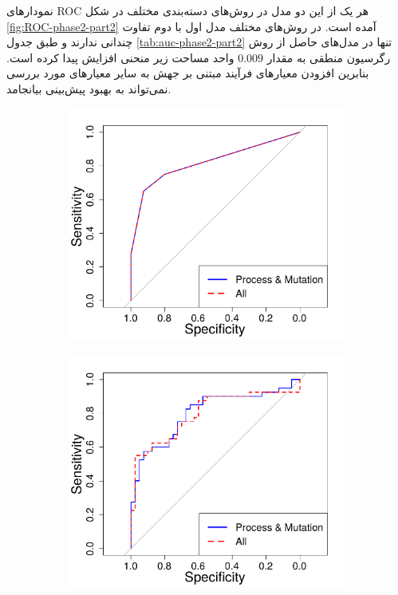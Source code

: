  نمودارهای ROC هر یک از این دو مدل در روش‌های دسته‌بندی مختلف در شکل \ref{fig:ROC-phase2-part2} آمده است. در روش‌های مختلف مدل اول با دوم تفاوت چندانی ندارند و طبق جدول \ref{tab:auc-phase2-part2} تنها در مدل‌های حاصل از روش رگرسیون منطقی به مقدار $0.009$ واحد مساحت زیر منحنی افزایش پیدا  کرده است. بنابرین افزودن  معیارهای فرآیند مبتنی بر جهش به سایر معیارهای مورد بررسی نمی‌تواند به بهبود پیش‌بینی بیانجامد.
\begin{figure}[H]
	\begin{subfigure}{.5\textwidth}
		\centering
		\includegraphics[width=\linewidth]{img/evaluation/phase2-part2-roc-dt.pdf}
		\caption{}
	\end{subfigure}
	\begin{subfigure}{.5\textwidth}
		\centering
		\includegraphics[width=\linewidth]{img/evaluation/phase2-part2-roc-svm.pdf}

\end{subfigure}
\end{figure}
